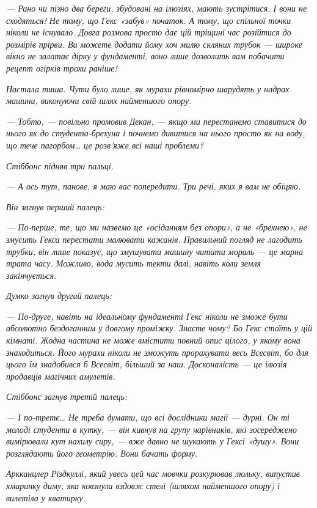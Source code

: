 \documentclass[12pt, a4paper, openany]{book}
\begin{document}
\begin{terrybox}
\textit{--- Рано чи пізно два береги, збудовані на ілюзіях, мають зустрітися. І вони не сходяться! Не тому, що Гекс «забув» початок. А тому, що спільної точки ніколи не існувало. Довга розмова просто дає цій тріщині час розійтися до розмірів прірви. Ви можете додати йому хоч милю скляних трубок --- широке вікно не залатає дірку у фундаменті, воно лише дозволить вам побачити рецепт огірків трохи раніше!}

\textit{Настала тиша. Чути було лише, як мурахи рівномірно шарудять у надрах машини, виконуючи свій шлях найменшого опору.}

\textit{--- Тобто, --- повільно промовив Декан, --- якщо ми перестанемо ставитися до нього як до студента-брехуна і почнемо дивитися на нього просто як на воду, що тече пагорбом\ldots{} це розв'яже всі наші проблеми?}

\textit{Стіббонс підняв три пальці.}

\textit{--- А ось тут, панове, я маю вас попередити. Три речі, яких я вам не обіцяю.}

\textit{Він загнув перший палець:}

\textit{--- По-перше, те, що ми назвемо це «осіданням без опори», а не «брехнею», не змусить Гекса перестати малювати кажанів. Правильний погляд не лагодить трубки, він лише показує, що змушувати машину читати мораль --- це марна трата часу. Можливо, вода \emph{мусить} текти далі, навіть коли земля закінчується.}

\textit{Думко загнув другий палець:}

\textit{--- По-друге, навіть на ідеальному фундаменті Гекс ніколи не зможе бути абсолютно бездоганним у довгому проміжку. Знаєте чому? Бо Гекс стоїть у цій кімнаті. Жодна частина не може вмістити повний опис цілого, у якому вона знаходиться. Його мурахи ніколи не зможуть прорахувати весь Всесвіт, бо для цього їм знадобився б Всесвіт, більший за наш. Досконалість --- це ілюзія продавців магічних амулетів.}

\textit{Стіббонс загнув третій палець:}

\textit{--- І по-третє\ldots{} Не треба думати, що всі дослідники магії --- дурні. Он ті молоді студенти в кутку, --- він кивнув на групу чарівників, які зосереджено вимірювали кут нахилу сиру, --- вже давно не шукають у Гексі «душу». Вони розглядають його геометрію. Вони бачать форму.}

\textit{Аркканцлер Різдкуллі, який увесь цей час мовчки розкурював люльку, випустив хмаринку диму, яка ковзнула вздовж стелі (шляхом найменшого опору) і вилетіла у кватирку.}


\end{terrybox}
\end{document}
